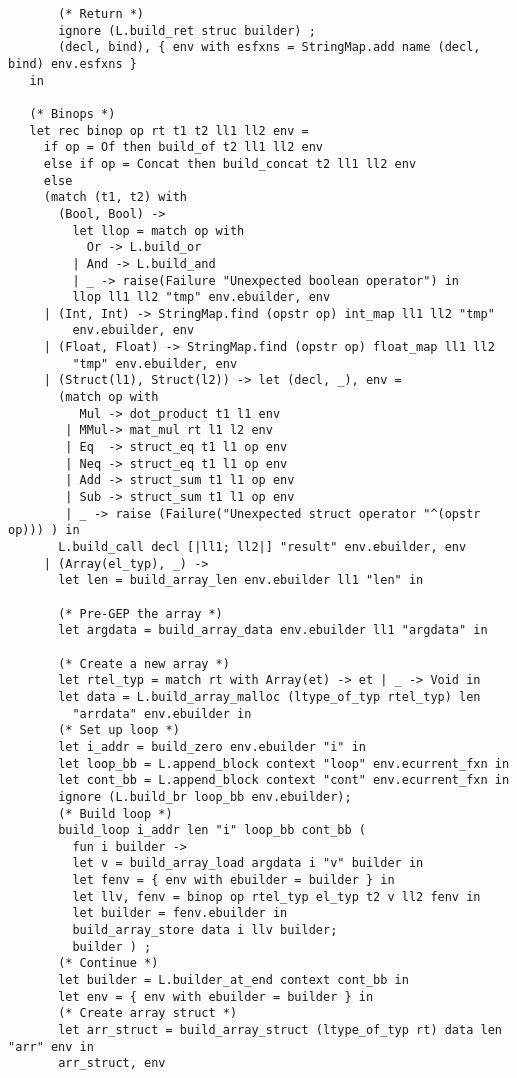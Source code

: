 \documentclass[main.tex]{subfiles}
\begin{document}
\begin{lstlisting}
       (* Return *)
       ignore (L.build_ret struc builder) ;
       (decl, bind), { env with esfxns = StringMap.add name (decl, bind) env.esfxns }
   in

   (* Binops *)
   let rec binop op rt t1 t2 ll1 ll2 env = 
     if op = Of then build_of t2 ll1 ll2 env
     else if op = Concat then build_concat t2 ll1 ll2 env
     else
     (match (t1, t2) with
       (Bool, Bool) ->
         let llop = match op with
           Or -> L.build_or
         | And -> L.build_and
         | _ -> raise(Failure "Unexpected boolean operator") in
         llop ll1 ll2 "tmp" env.ebuilder, env
     | (Int, Int) -> StringMap.find (opstr op) int_map ll1 ll2 "tmp"
         env.ebuilder, env
     | (Float, Float) -> StringMap.find (opstr op) float_map ll1 ll2
         "tmp" env.ebuilder, env
     | (Struct(l1), Struct(l2)) -> let (decl, _), env = 
       (match op with
          Mul -> dot_product t1 l1 env
        | MMul-> mat_mul rt l1 l2 env
        | Eq  -> struct_eq t1 l1 op env
        | Neq -> struct_eq t1 l1 op env
        | Add -> struct_sum t1 l1 op env
        | Sub -> struct_sum t1 l1 op env
        | _ -> raise (Failure("Unexpected struct operator "^(opstr op))) ) in
       L.build_call decl [|ll1; ll2|] "result" env.ebuilder, env
     | (Array(el_typ), _) ->
       let len = build_array_len env.ebuilder ll1 "len" in
      
       (* Pre-GEP the array *)
       let argdata = build_array_data env.ebuilder ll1 "argdata" in
     
       (* Create a new array *)
       let rtel_typ = match rt with Array(et) -> et | _ -> Void in
       let data = L.build_array_malloc (ltype_of_typ rtel_typ) len
         "arrdata" env.ebuilder in
       (* Set up loop *)
       let i_addr = build_zero env.ebuilder "i" in
       let loop_bb = L.append_block context "loop" env.ecurrent_fxn in
       let cont_bb = L.append_block context "cont" env.ecurrent_fxn in
       ignore (L.build_br loop_bb env.ebuilder);
       (* Build loop *)
       build_loop i_addr len "i" loop_bb cont_bb (
         fun i builder -> 
         let v = build_array_load argdata i "v" builder in
         let fenv = { env with ebuilder = builder } in
         let llv, fenv = binop op rtel_typ el_typ t2 v ll2 fenv in
         let builder = fenv.ebuilder in
         build_array_store data i llv builder;
         builder ) ;
       (* Continue *)
       let builder = L.builder_at_end context cont_bb in
       let env = { env with ebuilder = builder } in
       (* Create array struct *)
       let arr_struct = build_array_struct (ltype_of_typ rt) data len "arr" env in
       arr_struct, env


\end{lstlisting}
\end{document}

